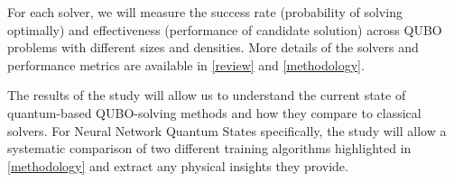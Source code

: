 

For each solver, we will measure the success rate (probability of solving optimally) and effectiveness (performance of candidate solution) across QUBO problems with different sizes and densities. More details of the solvers and performance metrics are available in \autoref{review} and \autoref{methodology}.

The results of the study will allow us to understand the current state of quantum-based QUBO-solving methods and how they compare to classical solvers. For Neural Network Quantum States specifically, the study will allow a systematic comparison of two different training algorithms highlighted in \autoref{methodology} and extract any physical insights they provide.
